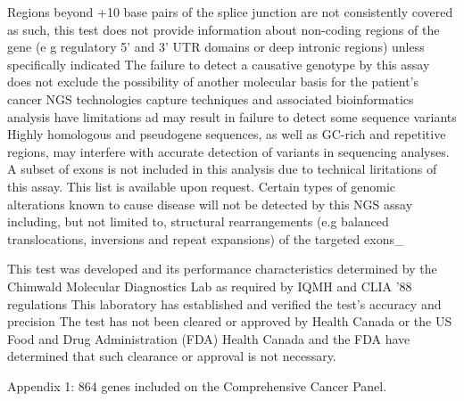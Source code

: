 \documentclass[8pt,letterpaper]{extarticle}
\begin{document}
{Regions beyond +10 base pairs of the splice junction are not consistently covered as such, this test does not provide information about non-coding regions of the gene (e g regulatory 5' and 3' UTR domains or deep intronic regions) unless specifically indicated The failure to detect a causative genotype by this assay does not exclude the possibility of another molecular basis for the patient's cancer NGS technologies capture techniques and associated bioinformatics analysis have limitations ad may result in failure to detect some sequence variants  Highly homologous and pseudogene sequences, as well as GC-rich and repetitive regions, may interfere with accurate detection of variants in sequencing analyses. A subset of exons is not included in this analysis due to technical liritations of this assay. This list is available upon request.   Certain types of genomic alterations known to cause disease will not be detected by this NGS assay including, but not limited to, structural rearrangements (e.g balanced translocations, inversions and repeat expansions) of the targeted exons\_

This test was developed and its performance characteristics determined by the Chimwald Molecular Diagnostics Lab as required by IQMH and CLIA '88 regulations This laboratory has established and verified the test's accuracy and precision The test has not been cleared or approved by Health Canada or the US Food and Drug Administration (FDA) Health Canada and the FDA have determined that such clearance or approval is not necessary.
}

Appendix 1: 864 genes included on the Comprehensive Cancer Panel. 
\end{document}
